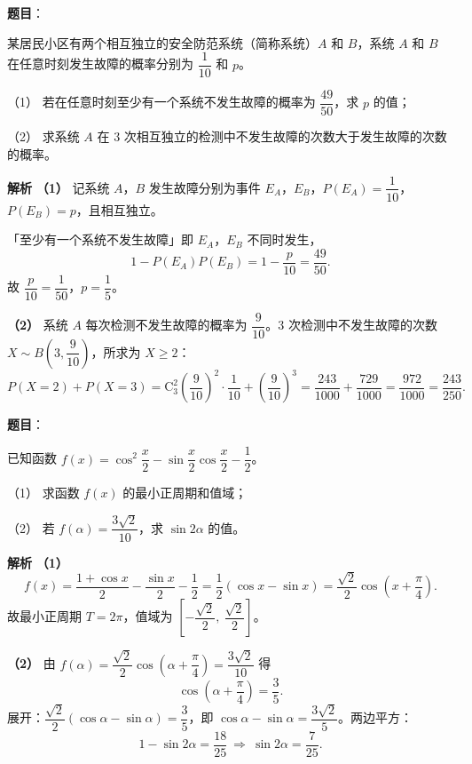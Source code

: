 \begin{answer}

\textbf{题目}：

某居民小区有两个相互独立的安全防范系统（简称系统）$A$ 和 $B$，系统 $A$ 和 $B$ 在任意时刻发生故障的概率分别为 $\dfrac1{10}$ 和 $p$。

（1） 若在任意时刻至少有一个系统不发生故障的概率为 $\dfrac{49}{50}$，求 $p$ 的值；

（2） 求系统 $A$ 在 $3$ 次相互独立的检测中不发生故障的次数大于发生故障的次数的概率。

\textbf{解析}
\textbf{（1）} 记系统 $A$，$B$ 发生故障分别为事件 $E_A$，$E_B$，$P(E_A)=\dfrac1{10}$，$P(E_B)=p$，且相互独立。

「至少有一个系统不发生故障」即 $E_A$，$E_B$ 不同时发生，
\nopagebreak[4]
\[1-P(E_A)P(E_B)=1-\frac p{10}=\frac{49}{50}.\]
故 $\dfrac p{10}=\dfrac1{50}$，$p=\dfrac15$。

\textbf{（2）} 系统 $A$ 每次检测不发生故障的概率为 $\dfrac9{10}$。$3$ 次检测中不发生故障的次数 $X\sim B\left(3,\dfrac9{10}\right)$，所求为 $X\geqslant2$：
\nopagebreak[4]
\[P(X=2)+P(X=3)=\mathrm C_3^2\left(\frac9{10}\right)^2\cdot\frac1{10}+\left(\frac9{10}\right)^3=\frac{243}{1000}+\frac{729}{1000}=\frac{972}{1000}=\frac{243}{250}.\]



\end{answer}
\begin{answer}

\textbf{题目}：

已知函数 $f(x)=\cos^2\dfrac x2-\sin\dfrac x2\cos\dfrac x2-\dfrac12$。

（1） 求函数 $f(x)$ 的最小正周期和值域；

（2） 若 $f(\alpha)=\dfrac{3\sqrt2}{10}$，求 $\sin2\alpha$ 的值。

\textbf{解析}
\textbf{（1）}
\nopagebreak[4]
\[f(x)=\frac{1+\cos x}2-\frac{\sin x}2-\frac12=\frac12\left(\cos x-\sin x\right)=\frac{\sqrt2}2\cos\left(x+\frac\pi4\right).\]
故最小正周期 $T=2\pi$，值域为 $\left[-\dfrac{\sqrt2}2,\ \dfrac{\sqrt2}2\right]$。

\textbf{（2）} 由 $f(\alpha)=\dfrac{\sqrt2}2\cos\left(\alpha+\dfrac\pi4\right)=\dfrac{3\sqrt2}{10}$ 得
\nopagebreak[4]
\[\cos\left(\alpha+\frac\pi4\right)=\frac35.\]
展开：$\dfrac{\sqrt2}2(\cos\alpha-\sin\alpha)=\dfrac35$，即 $\cos\alpha-\sin\alpha=\dfrac{3\sqrt2}5$。两边平方：
\nopagebreak[4]
\[1-\sin2\alpha=\frac{18}{25}\ \Rightarrow\ \sin2\alpha=\frac7{25}.\]



\end{answer}
